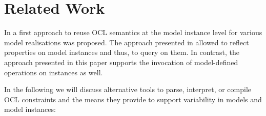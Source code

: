 \section{Related Work}
\label{sec:relatedWork}
In \cite{kolovos2006queries} a first approach to reuse OCL semantics at the model instance level
for various model realisations was proposed. The approach presented in \cite{kolovos2006queries}
allowed to reflect properties on model instances and thus, to query on them. In contrast, the
approach presented in this paper supports the invocation
of model-defined operations on instances as well. 

In the following we will discuss alternative tools to parse,
interpret, or compile OCL constraints and the means they provide
to support variability in models and model instances:


